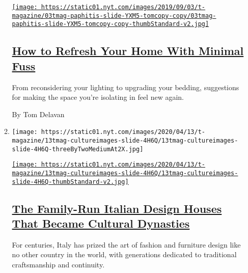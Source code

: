 \begin{enumerate}
\begin{enumerate}
    \href{/2020/05/21/t-magazine/redecorate-home-coronavirus.html}{\texttt{[image: https://static01.nyt.com/images/2019/09/03/t-magazine/03tmag-paphitis-slide-YXM5-tomcopy-copy/03tmag-paphitis-slide-YXM5-tomcopy-copy-thumbStandard-v2.jpg]}}

    \hypertarget{how-to-refresh-your-home-with-minimal-fuss}{%
    \subsection{\texorpdfstring{\href{/2020/05/21/t-magazine/redecorate-home-coronavirus.html}{How
    to Refresh Your Home With Minimal
    Fuss}}{How to Refresh Your Home With Minimal Fuss}}\label{how-to-refresh-your-home-with-minimal-fuss}}

    From reconsidering your lighting to upgrading your bedding,
    suggestions for making the space you're isolating in feel new again.

    By Tom Delavan
  \item
    \texttt{[image: https://static01.nyt.com/images/2020/04/13/t-magazine/13tmag-cultureimages-slide-4H6Q/13tmag-cultureimages-slide-4H6Q-threeByTwoMediumAt2X.jpg]}

    \href{/interactive/2020/04/13/t-magazine/italian-fashion-design-houses.html}{\texttt{[image: https://static01.nyt.com/images/2020/04/13/t-magazine/13tmag-cultureimages-slide-4H6Q/13tmag-cultureimages-slide-4H6Q-thumbStandard-v2.jpg]}}

    \hypertarget{the-family-run-italian-design-houses-that-became-cultural-dynasties}{%
    \subsection{\texorpdfstring{\href{/interactive/2020/04/13/t-magazine/italian-fashion-design-houses.html}{The
    Family-Run Italian Design Houses That Became Cultural
    Dynasties}}{The Family-Run Italian Design Houses That Became Cultural Dynasties}}\label{the-family-run-italian-design-houses-that-became-cultural-dynasties}}

    For centuries, Italy has prized the art of fashion and furniture
    design like no other country in the world, with generations
    dedicated to traditional craftsmanship and continuity.
  \end{enumerate}
\end{enumerate}

